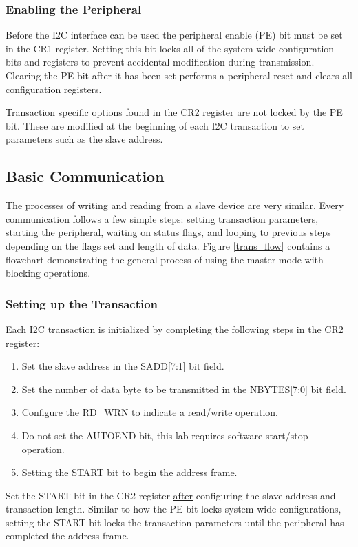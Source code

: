 \documentclass[11pt,fleqn]{book} %
\begin{document}
    \subsubsection{Enabling the Peripheral}
    Before the I2C interface can be used the peripheral enable (PE) bit must be set in the CR1 register. Setting this bit locks all of the system-wide configuration bits and registers to prevent accidental modification during transmission. Clearing the PE bit after it has been set performs a peripheral reset and clears all configuration registers. 
    
    Transaction specific options found in the CR2 register are not locked by the PE bit. These are modified at the beginning of each I2C transaction to set parameters such as the slave address.

\subsection{Basic Communication}
    The processes of writing and reading from a slave device are very similar. Every communication follows a few simple steps: setting transaction parameters, starting the peripheral, waiting on status flags, and looping to previous steps depending on the flags set and length of data. Figure \ref{trans_flow} contains a flowchart demonstrating the general process of using the master mode with blocking operations. 

    \subsubsection{Setting up the Transaction}
        Each I2C transaction is initialized by completing the following steps in the CR2 register:
        \begin{enumerate}
            \item Set the slave address in the SADD[7:1] bit field. 
            \item Set the number of data byte to be transmitted in the NBYTES[7:0] bit field.
            \item Configure the RD\_WRN to indicate a read/write operation.
            \item Do not set the AUTOEND bit, this lab requires software start/stop operation. 
            \item Setting the START bit to begin the address frame. 
        \end{enumerate}
    
    \begin{warning}
        Set the START bit in the CR2 register \underline{after} configuring the slave address and transaction length. Similar to how the PE bit locks system-wide configurations, setting the START bit locks the transaction parameters until the peripheral has completed the address frame. 
    \end{warning}
    
\end{document}
